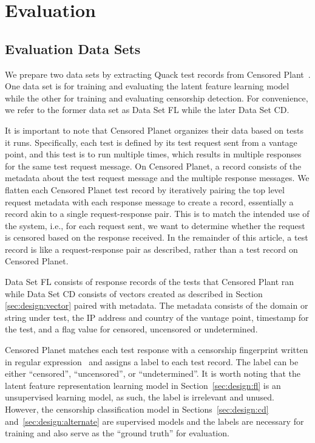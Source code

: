 \section{Evaluation}
\label{sec:eval}


\subsection{Evaluation Data Sets}
\label{sec:eval:data}


We prepare two data sets by extracting Quack test records from Censored 
Plant~\cite{sundara_raman_censored_2020}. One data set is for training and
evaluating the latent feature learning model while the other for training and
evaluating censorship detection.  For convenience, we refer to the
former data set as Data Set FL while the later Data Set CD. 

It is important to note that Censored Planet organizes their data based on
tests it runs. Specifically, each test is defined by its test request sent
from a vantage point, and this test is to run multiple times, which results in
multiple responses for the same test request message. On Censored Planet, a
record consists of the metadata about the test request message and the
multiple response messages. We flatten each Censored Planet test record by
iteratively pairing the top level request metadata with each response message
to create a record, essentially a record akin to a single request-response pair. 
This is to
match the intended use of the system, i.e., for each request sent, we want to
determine whether the request is censored based on the response received. In
the remainder of this article, a test record is like a request-response pair as described,
rather than a test record on Censored Planet.


Data Set FL
consists of \FLnrecords response records of the tests that Censored Plant ran
while Data Set CD consists of \CDnrecords vectors created as described in Section \ref{sec:design:vector} paired with metadata. The metadata consists of the domain or string under test, the IP address and country of the vantage point, timestamp for the test, and a flag value for censored, uncensored or undetermined. 


Censored Planet matches each test response with a censorship fingerprint
written in regular expression~\cite{sarah_laplante_blockpage_2021} and assigns
a label to each test record. The label can be either ``censored'', ``uncensored'',
or ``undetermined''. It is worth noting that the latent feature representation
learning model in Section~\ref{sec:design:fl} is an unsupervised learning
model, as such, the label is irrelevant and unused. However, the censorship
classification model in Sections~\ref{sec:design:cd}
and~\ref{sec:design:alternate} are supervised models and the labels are
necessary for training and also serve as the ``ground truth'' for evaluation.

